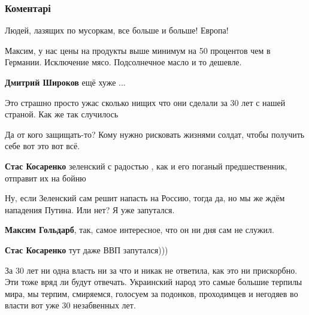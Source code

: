  
 
 
 
 
\subsubsection{Коментарі}

\begin{itemize} %
Людей, лазящих по мусоркам, все больше и больше! Европа!

Максим, у нас цены на продукты выше минимум на 50 процентов чем в Германии. Исключение мясо. Подсолнечное масло и то дешевле.

\textbf{Дмитрий Широков} ещё хуже ...

Это страшно просто ужас сколько нищих что они сделали за 30 лет с нашей страной. Как же так случилось


Да от кого защищать-то? Кому нужно рисковать жизнями солдат, чтобы получить
себе вот это вот всё.

\begin{itemize} %
\textbf{Стас Косаренко} зеленский с радостью , как и его поганый предшественник, отправит их на бойню

Ну, если Зеленский сам решит напасть на Россию, тогда да, но мы же ждём нападения Путина. Или нет? Я уже запутался.

\textbf{Максим Гольдарб}, так, самое интересное, что он ни дня сам не служил.

\textbf{Стас Косаренко} тут даже ВВП запутался)))
\end{itemize} %


За 30 лет ни одна власть ни за что и никак не ответила, как это ни прискорбно.
Эти тоже вряд ли будут отвечать. Украинский народ это самые большие терпилы
мира, мы терпим, смиряемся, голосуем за подонков, проходимцев и негодяев во
власти вот уже 30 незабвенных лет.


\end{itemize}
